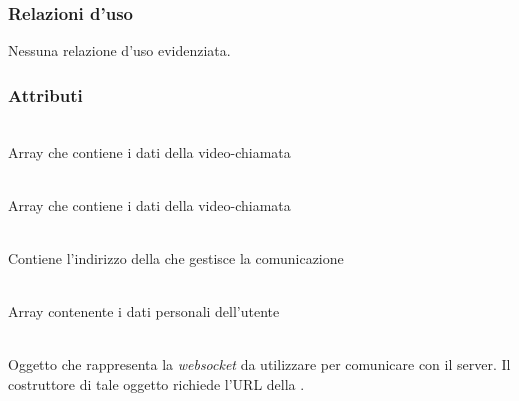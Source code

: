\subsubsection*{Relazioni d'uso}
Nessuna relazione d'uso evidenziata.

\subsubsection*{Attributi}
\begin{description}
\item{}\\
Array che contiene i dati della video-chiamata
\item{}\\
Array che contiene i dati della video-chiamata
\item{}\\
Contiene l'indirizzo della  che gestisce la comunicazione
\item{}\\
Array contenente i dati personali dell'utente
\item{}\\
Oggetto che rappresenta la \textit{websocket} da utilizzare per comunicare con il server. Il costruttore di tale oggetto richiede l'URL della .

\end{description}

